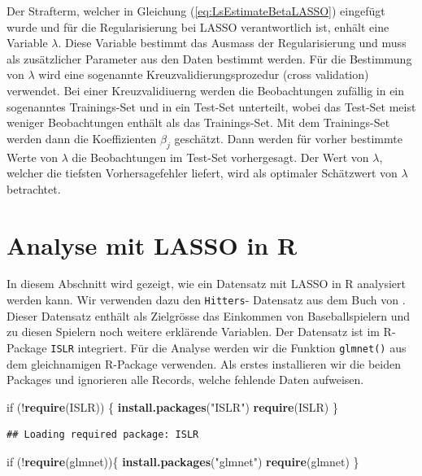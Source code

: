 \documentclass[]{book}
\newenvironment{Shaded}{\begin{snugshade}}{\end{snugshade}}
\newcommand{\KeywordTok}[1]{\textcolor[rgb]{0.13,0.29,0.53}{\textbf{{#1}}}}
\newcommand{\StringTok}[1]{\textcolor[rgb]{0.31,0.60,0.02}{{#1}}}
\newcommand{\NormalTok}[1]{{#1}}
\begin{document}
Der Strafterm, welcher in Gleichung (\ref{eq:LsEstimateBetaLASSO})
eingefügt wurde und für die Regularisierung bei LASSO verantwortlich
ist, enhält eine Variable \(\lambda\). Diese Variable bestimmt das
Ausmass der Regularisierung und muss als zusätzlicher Parameter aus den
Daten bestimmt werden. Für die Bestimmung von \(\lambda\) wird eine
sogenannte Kreuzvalidierungsprozedur (cross validation) verwendet. Bei
einer Kreuzvalidiuerng werden die Beobachtungen zufällig in ein
sogenanntes Trainings-Set und in ein Test-Set unterteilt, wobei das
Test-Set meist weniger Beobachtungen enthält als das Trainings-Set. Mit
dem Trainings-Set werden dann die Koeffizienten \(\beta_j\) geschätzt.
Dann werden für vorher bestimmte Werte von \(\lambda\) die Beobachtungen
im Test-Set vorhergesagt. Der Wert von \(\lambda\), welcher die tiefsten
Vorhersagefehler liefert, wird als optimaler Schätzwert von \(\lambda\)
betrachtet.

\section{Analyse mit LASSO in R}\label{analyse-mit-lasso-in-r}

In diesem Abschnitt wird gezeigt, wie ein Datensatz mit LASSO in R
analysiert werden kann. Wir verwenden dazu den \texttt{Hitters}-
Datensatz aus dem Buch von \citet{JWHT2013}. Dieser Datensatz enthält
als Zielgrösse das Einkommen von Baseballspielern und zu diesen Spielern
noch weitere erklärende Variablen. Der Datensatz ist im R-Package
\texttt{ISLR} integriert. Für die Analyse werden wir die Funktion
\texttt{glmnet()} aus dem gleichnamigen R-Package verwenden. Als erstes
installieren wir die beiden Packages und ignorieren alle Records, welche
fehlende Daten aufweisen.

\begin{Shaded}
\begin{Highlighting}[]
\NormalTok{if (!}\KeywordTok{require}\NormalTok{(ISLR)) \{}
  \KeywordTok{install.packages}\NormalTok{(}\StringTok{"ISLR"}\NormalTok{)}
  \KeywordTok{require}\NormalTok{(ISLR)}
\NormalTok{\}}
\end{Highlighting}
\end{Shaded}

\begin{verbatim}
## Loading required package: ISLR
\end{verbatim}

\begin{Shaded}
\begin{Highlighting}[]
\NormalTok{if (!}\KeywordTok{require}\NormalTok{(glmnet))\{}
  \KeywordTok{install.packages}\NormalTok{(}\StringTok{"glmnet"}\NormalTok{)}
  \KeywordTok{require}\NormalTok{(glmnet)}
\NormalTok{\}}
\end{Highlighting}
\end{Shaded}
\end{document}
